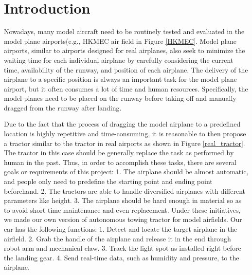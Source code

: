 \section{Introduction}{
\par\noindent Nowadays, many model aircraft need  to be routinely tested and evaluated in the model plane airports(e.g., HKMEC air field in Figure \ref{HKMEC}. Model plane airports, similar to airports designed for real airplanes, also seek to minimize the waiting time for each individual airplane by carefully considering the current time, availability of the runway, and position of each airplane. The delivery of the airplane to a specific position is always an important task for the model plane airport, but it often consumes a lot of time and human resources. Specifically, the model planes need to be placed on the runway before taking off and manually dragged from the runway after landing. 

\par\noindent Due to the fact that the process of dragging the model airplane to a predefined location is highly repetitive and time-consuming, it is reasonable to then propose a tractor similar to the tractor in real airports as shown in Figure \ref{real_tractor}. The tractor in this case should be generally replace the task as performed by human in the past. Thus, in order to accomplish these tasks, there are several goals or requirements of this project: 1. The airplane should be almost automatic, and people only need to predefine the starting point and ending point beforehand. 2. The tractors are able to handle diversified airplanes with different parameters like height. 3. The airplane should be hard enough in material so as to avoid short-time maintenance and even replacement. Under these initiatives, we made our own version of autonomous towing tractor for model airfields. Our car has the following functions: 1. Detect and locate the target airplane in the airfield. 2. Grab the handle of the airplane and release it in the end through robot arm and mechanical claw. 3. Track the light spot as installed right before the landing gear. 4. Send real-time data, such as humidity and pressure, to the airplane.



}
